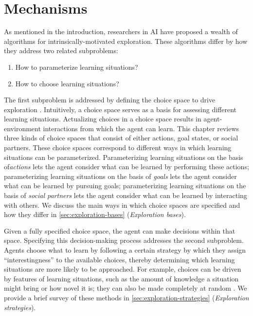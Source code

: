 \section{Mechanisms}\label{sec:3-mechanisms}
As mentioned in the introduction, researchers in \ac{AI} have proposed a wealth of algorithms for intrinsically-motivated exploration. These algorithms differ by how they address two related subproblems:

\begin{enumerate}
    \item How to parameterize learning situations?
    \item How to choose learning situations?
\end{enumerate}

The first subproblem is addressed by defining the choice space to drive exploration \cite{moulin-frier_exploration_2013}. Intuitively, a choice space serves as a basis for assessing different learning situations. Actualizing choices in a choice space results in agent-environment interactions from which the agent can learn. This chapter reviews three kinds of choice spaces that consist of either actions, goal states, or social partners. These choice spaces correspond to different ways in which learning situations can be parameterized. Parameterizing learning situations on the basis of\emph{actions} lets the agent consider what can be learned by performing these actions; parameterizing learning situations on the basis of \emph{goals} lets the agent consider what can be learned by pursuing goals; parameterizing learning situations on the basis of \emph{social partners} lets the agent consider what can be learned by interacting with others. We discuss the main ways in which choice spaces are specified and how they differ in \autoref{sec:exploration-bases} (\textit{Exploration bases}).

Given a fully specified choice space, the agent can make decisions within that space. Specifying this decision-making process addresses the second subproblem. Agents choose what to learn by following a certain strategy by which they assign “interestingness” to the available choices, thereby determining which learning situations are more likely to be approached. For example, choices can be driven by features of learning situations, such as the amount of knowledge a situation might bring or how novel it is; they can also be made completely at random \cite[e.g., ][]{colas_gep-pg_2018,colas_language_2020}. We provide a brief survey of these methods in \autoref{sec:exploration-strategies} (\textit{Exploration strategies}).

